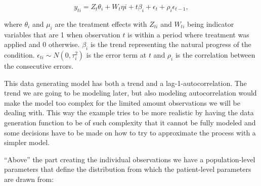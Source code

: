 \documentclass[12pt,a4paper,leqno]{report}
\theoremstyle{plain}
\theoremstyle{definition}
\theoremstyle{remark}
\begin{document}
\begin{def}\label{simulationmodel}
    \begin{equation}\label{}
        y_{ti} = Z_t\theta_{i} + W_t\eta{i} + t\beta_i + \epsilon_t + \rho_i\epsilon_{t-1},
    \end{equation}
\end{def}where \(\theta_i\) and \(\mu_i\) are the treatment effects with \(Z_{ti}\) and \(W_{ti}\) being indicator
variables that are 1 when observation \(t\) is within a period where treatment was applied and
0 otherwise. \(\beta_i\) is the trend representing the natural progress of the
condition. \(\epsilon_{ti} \sim N(0,\tau_i^2) \) is the error term at \(t\) and
\(\rho_i\) is the correlation between the consecutive errors.

This data generating model has both a trend and a lag-1-autocorrelation. The trend we
are going to be modeling later, but also modeling autocorrelation would make the model
too complex for the limited amount observations we will be dealing with. This way the example tries to be more realistic
by having the data generation function to be of such complexity that it cannot be
fully modeled and some decisions have to be made on how to try to approximate
the process with a simpler model.

``Above'' the part creating the individual observations we have a population-level parameters
that define the distribution from which the patient-level parameters are drawn from:

\bigskip

\end{document}
